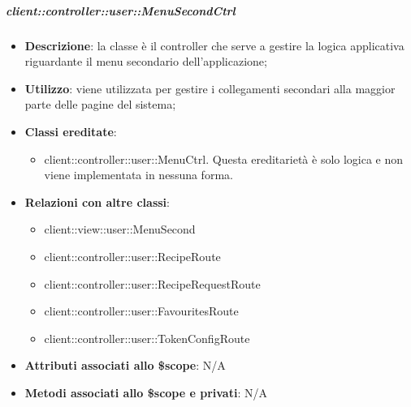 		\subparagraph{client::controller::user::MenuSecondCtrl} %
		\label{subp:client_controller_user_menusecondctrl}

			\begin{itemize}
				\item \textbf{Descrizione}: la classe è il controller che serve a gestire la logica applicativa riguardante il menu secondario dell'applicazione;
				\item \textbf{Utilizzo}: viene utilizzata per gestire i collegamenti secondari alla maggior parte delle pagine del sistema;
				\item \textbf{Classi ereditate}:
					\begin{itemize}
						\item client::controller::user::MenuCtrl. Questa ereditarietà è solo logica e non viene implementata in nessuna forma.
					\end{itemize}
				\item \textbf{Relazioni con altre classi}:
					\begin{itemize}
						\item client::view::user::MenuSecond
						\item client::controller::user::RecipeRoute
						\item client::controller::user::RecipeRequestRoute
						\item client::controller::user::FavouritesRoute
						\item client::controller::user::TokenConfigRoute
					\end{itemize}
				\item \textbf{Attributi associati allo \$scope}: N/A
				\item \textbf{Metodi associati allo \$scope e privati}: N/A
			\end{itemize}


